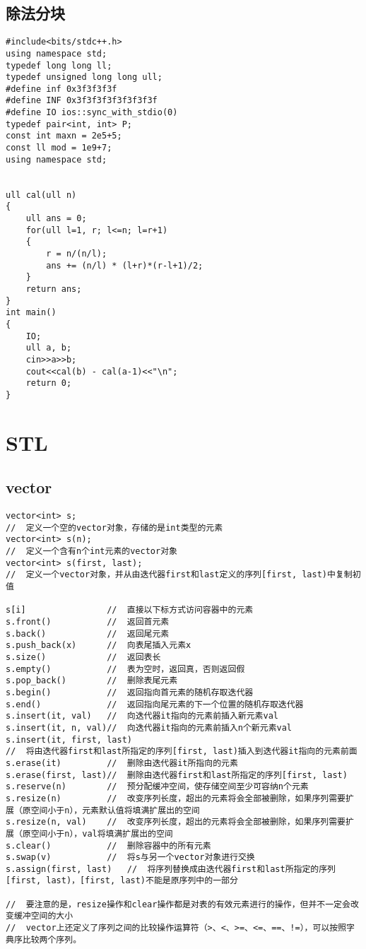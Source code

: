 \subsection{除法分块}
\begin{lstlisting}
#include<bits/stdc++.h>
using namespace std;
typedef long long ll;
typedef unsigned long long ull;
#define inf 0x3f3f3f3f
#define INF 0x3f3f3f3f3f3f3f3f
#define IO ios::sync_with_stdio(0)
typedef pair<int, int> P;
const int maxn = 2e5+5;
const ll mod = 1e9+7;
using namespace std;


ull cal(ull n)
{
	ull ans = 0;
	for(ull l=1, r; l<=n; l=r+1)
	{
		r = n/(n/l);
		ans += (n/l) * (l+r)*(r-l+1)/2;
	}
	return ans;
}
int main()
{
	IO;
	ull a, b;
	cin>>a>>b;
	cout<<cal(b) - cal(a-1)<<"\n";
	return 0;
}
\end{lstlisting}

\section{STL}
\subsection{vector}
\begin{lstlisting}
vector<int> s;      
//  定义一个空的vector对象，存储的是int类型的元素
vector<int> s(n);   
//  定义一个含有n个int元素的vector对象
vector<int> s(first, last); 
//  定义一个vector对象，并从由迭代器first和last定义的序列[first, last)中复制初值

s[i]                //  直接以下标方式访问容器中的元素
s.front()           //  返回首元素
s.back()            //  返回尾元素
s.push_back(x)      //  向表尾插入元素x
s.size()            //  返回表长
s.empty()           //  表为空时，返回真，否则返回假
s.pop_back()        //  删除表尾元素
s.begin()           //  返回指向首元素的随机存取迭代器
s.end()             //  返回指向尾元素的下一个位置的随机存取迭代器
s.insert(it, val)   //  向迭代器it指向的元素前插入新元素val
s.insert(it, n, val)//  向迭代器it指向的元素前插入n个新元素val
s.insert(it, first, last)   
//  将由迭代器first和last所指定的序列[first, last)插入到迭代器it指向的元素前面
s.erase(it)         //  删除由迭代器it所指向的元素
s.erase(first, last)//  删除由迭代器first和last所指定的序列[first, last)
s.reserve(n)        //  预分配缓冲空间，使存储空间至少可容纳n个元素
s.resize(n)         //  改变序列长度，超出的元素将会全部被删除，如果序列需要扩展（原空间小于n），元素默认值将填满扩展出的空间
s.resize(n, val)    //	改变序列长度，超出的元素将会全部被删除，如果序列需要扩展（原空间小于n），val将填满扩展出的空间
s.clear()           //  删除容器中的所有元素
s.swap(v)           //  将s与另一个vector对象进行交换
s.assign(first, last)	//  将序列替换成由迭代器first和last所指定的序列[first, last)，[first, last)不能是原序列中的一部分

//  要注意的是，resize操作和clear操作都是对表的有效元素进行的操作，但并不一定会改变缓冲空间的大小
//  vector上还定义了序列之间的比较操作运算符（>、<、>=、<=、==、!=），可以按照字典序比较两个序列。
\end{lstlisting}


